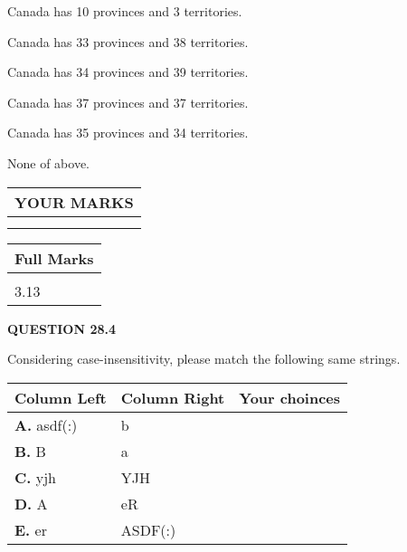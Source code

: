 \documentclass[12pt]{article}
\begin{document}
  
 
 
Canada has  %
10 provinces and  %
3 territories.
 
 
Canada has  %
33 provinces and  %
38 territories.
 
 
Canada has  %
34 provinces and  %
39 territories.
 
 
Canada has  %
37 provinces and  %
37 territories.
 
 
Canada has  %
35 provinces and  %
34 territories.
 
 
 None of above.
 
 
  
\vspace{0.2in}
  
\noindent\begin{tabular}{|l|}
\hline
 YOUR MARKS  \\
\hline
 \\ 
 \\ 
\hline
\end{tabular}
\hspace{0.05in} \begin{tabular}{|l|}
\hline
 Full Marks  \\
\hline
 \\ 
3.13 \\
\hline
\end{tabular}
{\textbf{\Large{QUESTION
28.4 
}}}
  
  
Considering case-insensitivity, please match the following same strings.
  
  
\begin{tabular}{|l|l|l|}
 \hline
 Column Left & Column Right  & Your choinces \\ 
 \hline
{\textbf{\large{
A.}}}
asdf(:)
  & 
b
 & 
 \\ 
 \hline
{\textbf{\large{
B.}}}
B
  & 
a
 & 
 \\ 
 \hline
{\textbf{\large{
C.}}}
yjh
  & 
YJH
 & 
 \\ 
 \hline
{\textbf{\large{
D.}}}
A
  & 
eR
 & 
 \\ 
 \hline
{\textbf{\large{
E.}}}
er
  & 
ASDF(:)
 & 
 \\ 
 \hline
 \end{tabular}
  
  
 
  
\vspace{0.2in}
  
\end{document}
